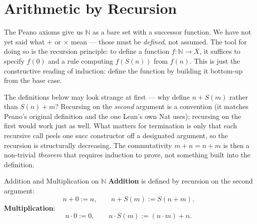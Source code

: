 \documentclass[12pt, openany]{book}
\theoremstyle{plain}
\theoremstyle{definition}
\theoremstyle{remark}
\newcommand{\N}{\mathbb{N}}
\newcommand{\li}[1]{{\ttfamily\small\color{tealaccent}#1}}
\begin{document}
\section{Arithmetic by Recursion}

The Peano axioms give us $\N$ as a bare set with a successor function.  We have not yet said what $+$ or $\times$ mean --- those must be \emph{defined}, not assumed.  The tool for doing so is the recursion principle: to define a function $f : \N \to X$, it suffices to specify $f(0)$ and a rule computing $f(S(n))$ from $f(n)$.  This is just the constructive reading of induction: define the function by building it bottom-up from the base case.

The definitions below may look strange at first --- why define $n + S(m)$ rather than $S(n) + m$?  Recursing on the \emph{second} argument is a convention (it matches Peano's original definition and the one Lean's own \li{Nat} uses); recursing on the first would work just as well.  What matters for termination is only that each recursive call peels one \li{succ} constructor off a designated argument, so the recursion is structurally decreasing.  The commutativity $m + n = n + m$ is then a non-trivial \emph{theorem} that requires induction to prove, not something built into the definition.

\begin{defbox}{Addition and Multiplication on $\N$}
\textbf{Addition} is defined by recursion on the second argument:
\[ n + 0 := n, \qquad n + S(m) := S(n + m). \]
\textbf{Multiplication}:
\[ n \cdot 0 := 0, \qquad n \cdot S(m) := (n \cdot m) + n. \]
\end{defbox}
\color{black}
\end{document}
